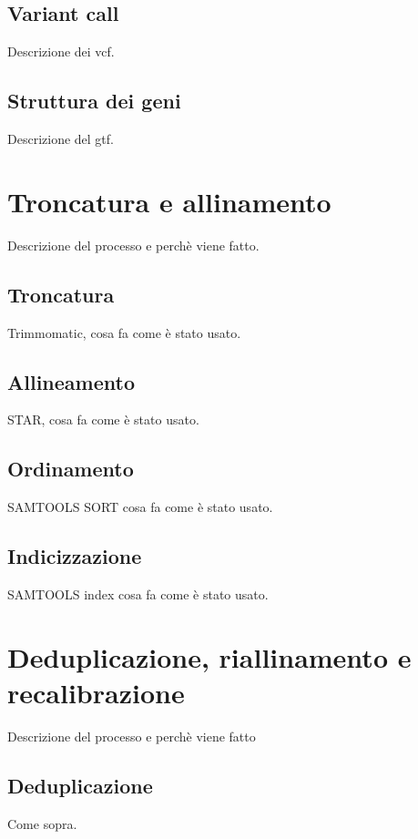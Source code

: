     \subsection{Variant call}
    \label{subsec:vcf}
    Descrizione dei vcf.

    \subsection{Struttura dei geni}
    \label{subsec:gtf}
    Descrizione del gtf.

  \section{Troncatura e allinamento}
  \label{sec:trimm_star}
  Descrizione del processo e perch\`e viene fatto.

    \subsection{Troncatura}
    \label{subsec:trimm}
    Trimmomatic, cosa fa come \`e stato usato.

    \subsection{Allineamento}
    \label{subsec:star}
    STAR, cosa fa come \`e stato usato.

    \subsection{Ordinamento}
    \label{subsec:sorting}
    SAMTOOLS SORT cosa fa come \`e stato usato.

    \subsection{Indicizzazione}
    \label{subsec:indexing}
    SAMTOOLS index cosa fa come \`e stato usato.

  \section{Deduplicazione, riallinamento e recalibrazione}
  \label{sec:recalibration}
  Descrizione del processo e perch\`e viene fatto

    \subsection{Deduplicazione}
    \label{subsec:dedup}
    Come sopra.

